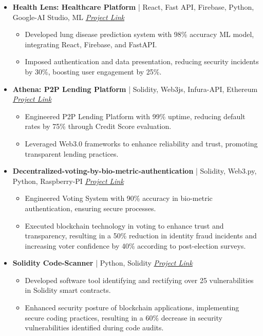 \documentclass{article}
\begin{document}
\begin{itemize}[leftmargin=*]
    \item \textbf{Health Lens: Healthcare Platform} | React, Fast API, Firebase, Python, Google-AI Studio, ML \hfill
    \textit{\href{https://github.com/ayyush1738/Healthcare-App}{Project Link}}
    \begin{itemize}[leftmargin=*]
        \item Developed lung disease prediction system with 98\% accuracy ML model, integrating React, Firebase, and FastAPI.
        \item Imposed authentication and data presentation, reducing security incidents by 30\%, boosting user engagement by 25\%.
    \end{itemize}
    \item \textbf{Athena: P2P Lending Platform} | Solidity, Web3js, Infura-API, Ethereum \hfill
    \textit{\href{https://devfolio.co/projects/athena-fe0f}{Project Link}}
    \begin{itemize}[leftmargin=*]
       \item Engineered P2P Lending Platform with 99\% uptime, reducing default rates by 75\% through Credit Score evaluation.
      \item Leveraged Web3.0 frameworks to enhance reliability and trust, promoting transparent lending practices.
    \end{itemize}

    \item \textbf{Decentralized-voting-by-bio-metric-authentication} | Solidity, Web3.py, Python, Raspberry-PI \hfill
    \textit{\href{https://github.com/ayyush1738/Decentralized-voting-by-biometric-authentication-using-Raspberry-Pi-400}{Project Link}} 
    \begin{itemize}[leftmargin=*]
       \item Engineered Voting System with 90\% accuracy in bio-metric authentication, ensuring secure processes.
       \item Executed blockchain technology in voting to enhance trust and transparency, resulting in a 50\% reduction in identity fraud incidents and increasing voter confidence by 40\% according to post-election surveys.
   \end{itemize}

    \item \textbf{Solidity Code-Scanner} | Python, Solidity \hfill
    \textit{\href{https://github.com/ayyush1738/soliditycode_scanner}{Project Link}} 
    \begin{itemize}[leftmargin=*]
       \item Developed software tool identifying and rectifying over 25 vulnerabilities in Solidity smart contracts.
      \item Enhanced security posture of blockchain applications, implementing secure coding practices, resulting in a 60\% decrease in security vulnerabilities identified during code audits.
   \end{itemize}
\end{itemize}
\end{document}
